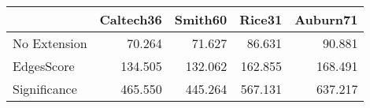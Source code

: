 \begin{tabular}{lrrrr}
\toprule
{} & Caltech36 & Smith60 &  Rice31 & Auburn71 \\
\midrule
No Extension &    70.264 &  71.627 &  86.631 &   90.881 \\
EdgesScore   &   134.505 & 132.062 & 162.855 &  168.491 \\
Significance &   465.550 & 445.264 & 567.131 &  637.217 \\
\bottomrule
\end{tabular}
